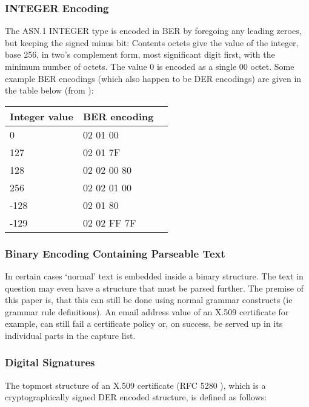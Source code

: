 \subsubsection{INTEGER Encoding}

The ASN.1 INTEGER type is encoded in BER by foregoing any leading zeroes, 
but keeping the signed minus bit:
Contents octets give the value of the integer, base 256, in two's 
complement form, most significant digit first, with the minimum number of 
octets. The value 0 is encoded as a single 00 octet. 
Some example BER encodings (which also happen to be DER encodings) are 
given in the table below (from \cite{bib:ber}):

\begin{center}
\begin{tabular}{|l|l|l|}
\hline
\textbf{Integer value} & \textbf{BER encoding} \\
\hline
0 & 02 01 00 \\
\hline
127 & 02 01 7F \\
\hline
128 & 02 02 00 80 \\
\hline
256 & 02 02 01 00 \\
\hline
-128 & 02 01 80 \\
\hline
-129 & 02 02 FF 7F \\
\hline
\end{tabular}
\end{center}

\subsubsection{Binary Encoding Containing Parseable Text}

In certain cases ‘normal’ text is embedded inside a binary structure. 
The text in question may even have a structure that must be parsed 
further. The premise of this paper is, that this can still be done using 
normal grammar constructs (ie grammar rule definitions). An email address 
value of an X.509 certificate for example, can still fail a certificate 
policy or, on success, be served up in its individual parts in the capture 
list.

\subsubsection{Digital Signatures}
The topmost structure of an X.509 certificate (RFC 5280 \cite{bib:cert}),
which is a cryptographically signed DER encoded structure,
is defined as follows:

